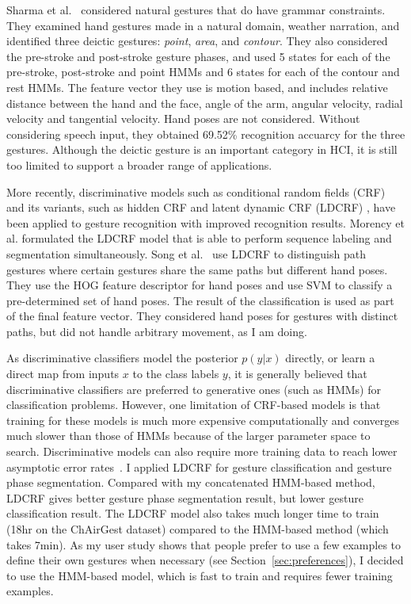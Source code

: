 Sharma et al.~\cite{sharma00} considered natural gestures that do
have grammar constraints.
They examined hand gestures made in a natural domain, weather narration, and
identified three deictic gestures:
\textit{point}, \textit{area}, and \textit{contour}. They also
considered the pre-stroke and post-stroke gesture phases, and used 5 states for
each of the pre-stroke, post-stroke and point HMMs and 6 states for each of the
contour and rest HMMs. The feature vector they use is motion based, and
includes relative distance between the hand and the face, angle of the arm,
angular velocity, radial velocity and tangential velocity. Hand poses are not
considered.
Without considering speech input, they obtained 69.52\% recognition accuarcy for the three gestures.
Although the deictic gesture is an important category in HCI, it is still too
limited to support a broader range of applications.

More recently, discriminative models such as
conditional random fields (CRF) and its variants, such as hidden CRF
\cite{wang06} and latent dynamic CRF (LDCRF) \cite{morency07}, have been
applied to gesture recognition with improved recognition results. Morency et al.
\cite{morency07} formulated the LDCRF model that is able to perform sequence labeling and segmentation simultaneously. 
Song et al.~\cite{song12} use LDCRF to distinguish path gestures where
certain gestures share the same paths but different hand poses. They use the HOG
feature descriptor for hand poses and use SVM to classify a pre-determined
set of hand poses. The result of the classification is used as part of the final
feature vector. They considered hand poses for gestures with distinct paths, but
did not handle arbitrary movement, as I am doing.

As discriminative classifiers model the posterior $p(y|x)$ directly, or
learn a direct map from inputs $x$ to the class labels $y$, it is
generally believed that discriminative classifiers are preferred to
generative ones (such as HMMs) for classification problems.
However, one limitation of CRF-based models is that training for these models
is much more expensive computationally and converges much slower than those of
HMMs \cite{lafferty01} because of the larger parameter space to search.
Discriminative models can also require more training data to reach
lower asymptotic error rates~\cite{ng02}. I applied LDCRF for gesture
classification and gesture phase segmentation.
Compared with my concatenated HMM-based method, LDCRF gives better gesture phase
segmentation result, but lower gesture classification result. The LDCRF model
also takes much longer time to train (18hr on the ChAirGest dataset) compared to
the HMM-based method (which takes 7min). As my user study shows that people
prefer to use a few examples to define their own gestures when necessary (see
Section~\ref{sec:preferences}), I decided to use the HMM-based model, which is
fast to train and requires fewer training examples.

